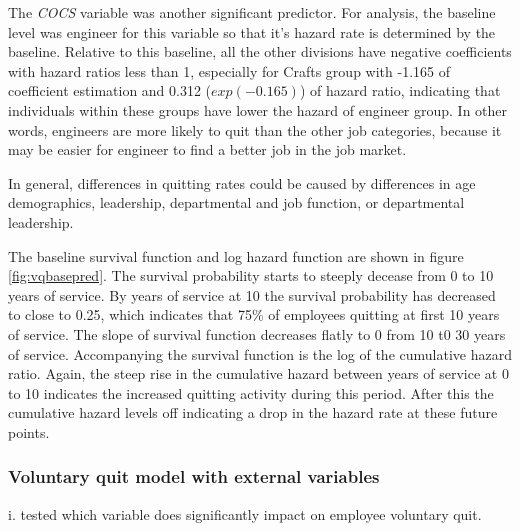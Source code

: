 \documentclass[12pt,letterpaper]{article}
\begin{document}
The {\it COCS} variable was another significant predictor.  For analysis, the baseline level was engineer for this variable so that it's hazard rate is determined by the baseline. Relative to this baseline, all the other divisions have negative coefficients with hazard ratios less than 1, especially for Crafts group with -1.165 of coefficient estimation and 0.312 ($exp(-0.165)$) of hazard ratio, indicating that individuals within these groups have lower the hazard of engineer group. In other words, engineers are more likely to quit than the other job categories, because it may be easier for engineer to find a better job in the job market.

In general, differences in quitting rates could be caused by differences in age demographics, leadership, departmental and job function, or departmental leadership.

The baseline survival function and log hazard function are shown in figure \ref{fig:vqbasepred}. The survival probability starts to steeply decease from 0  to 10 years of service. By years of service at 10 the survival probability has decreased to close to 0.25, which indicates that 75\% of employees quitting at first 10 years of service.  The slope of survival function decreases flatly to 0 from 10 t0 30 years of service.  Accompanying the survival function is the log of the cumulative hazard ratio.  Again, the steep rise in the cumulative hazard between years of service at 0 to 10 indicates the increased quitting activity during this period.  After this the cumulative hazard levels off indicating a drop in the hazard rate at these future points.


\subsubsection{Voluntary quit model with external variables}
i. tested which variable does significantly impact on employee voluntary quit.
\end{document}
